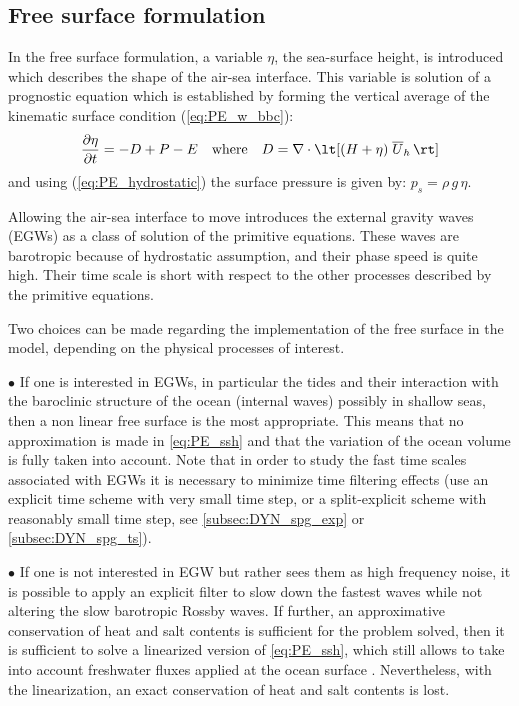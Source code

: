 \documentclass[../main/NEMO_manual]{subfiles}
\begin{document}
\subsection{Free surface formulation}
\label{subsec:PE_free_surface}

In the free surface formulation, a variable $\eta$, the sea-surface height,
is introduced which describes the shape of the air-sea interface.
This variable is solution of a prognostic equation which is established by forming the vertical average of
the kinematic surface condition (\autoref{eq:PE_w_bbc}):
\begin{equation}
  \label{eq:PE_ssh}
  \pd[\eta]{t} = - D + P - E \quad \text{where} \quad D = \nabla \cdot \lt[ (H + \eta) \; \overline{U}_h \, \rt]
\end{equation}
and using (\autoref{eq:PE_hydrostatic}) the surface pressure is given by: $p_s = \rho \, g \, \eta$.

Allowing the air-sea interface to move introduces the external gravity waves (EGWs) as
a class of solution of the primitive equations.
These waves are barotropic because of hydrostatic assumption, and their phase speed is quite high.
Their time scale is short with respect to the other processes described by the primitive equations.

Two choices can be made regarding the implementation of the free surface in the model,
depending on the physical processes of interest.

$\bullet$ If one is interested in EGWs, in particular the tides and their interaction with
the baroclinic structure of the ocean (internal waves) possibly in shallow seas,
then a non linear free surface is the most appropriate.
This means that no approximation is made in \autoref{eq:PE_ssh} and that
the variation of the ocean volume is fully taken into account.
Note that in order to study the fast time scales associated with EGWs it is necessary to
minimize time filtering effects
(use an explicit time scheme with very small time step, or a split-explicit scheme with reasonably small time step,
see \autoref{subsec:DYN_spg_exp} or \autoref{subsec:DYN_spg_ts}).

$\bullet$ If one is not interested in EGW but rather sees them as high frequency noise,
it is possible to apply an explicit filter to slow down the fastest waves while
not altering the slow barotropic Rossby waves.
If further, an approximative conservation of heat and salt contents is sufficient for the problem solved,
then it is sufficient to solve a linearized version of \autoref{eq:PE_ssh},
which still allows to take into account freshwater fluxes applied at the ocean surface \citep{Roullet_Madec_JGR00}.
Nevertheless, with the linearization, an exact conservation of heat and salt contents is lost.
\end{document}
